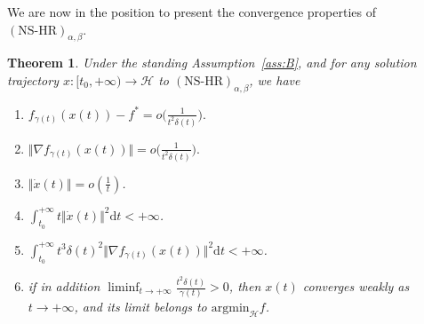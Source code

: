 \documentclass[11pt]{article}
\numberwithin{equation}{section}
\newtheorem{theorem}{Theorem}[section]
\begin{document}
We are now in the position to present the convergence properties of $(\text{NS-HR})_{\alpha,\beta}$.
\begin{theorem}
\label{first convergence result}
Under the standing Assumption~\ref{ass:B}, and for any solution trajectory $x:[t_0,+\infty) \to \mathcal{H}$ to $(\text{NS-HR})_{\alpha,\beta}$, we have 
\begin{enumerate}[label=(\roman*)]
               \item $\displaystyle f_{\gamma(t)}(x(t))-f^*=o\Big(\frac{1}{t^2\delta(t)}\Big).$
        \item $\displaystyle \Vert \nabla f_{\gamma(t)}(x(t))\Vert=o\Big(\frac{1}{t^2\delta(t)}\Big).$
        \item $\Vert \dot{x}(t) \Vert = o(\frac{1}{t})$.
        \item $\displaystyle \int_{t_0}^{+\infty}t\Vert \dot{x}(t)\Vert^2\mathrm{d}t < +\infty$. 
        \item $\displaystyle \int_{t_0}^{+\infty}t^3\delta(t)^2\Vert \nabla f_{\gamma(t)}(x(t))\Vert^2 \mathrm{d}t <+\infty$.
        \item if in addition $\liminf_{t\to +\infty}\frac{t^2\delta(t)}{\gamma(t)}>0$, then $x(t)$ converges weakly as $t \to +\infty$, and its limit belongs to $\text{argmin}_{\mathcal{H}}f$.
    \end{enumerate}
\end{theorem}
\end{document}
